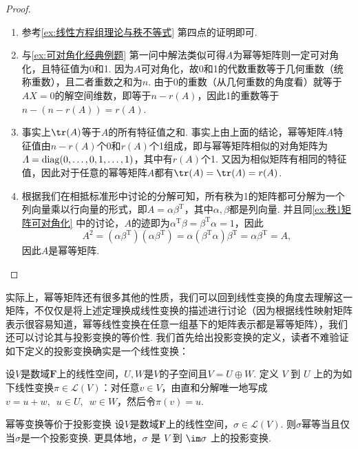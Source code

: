\begin{proof}
    \begin{enumerate}
        \item 参考\autoref{ex:线性方程组理论与秩不等式} 第四点的证明即可.

        \item 与\autoref{ex:可对角化经典例题} 第一问中解法类似可得$A$为幂等矩阵则一定可对角化，且特征值为0和1. 因为$A$可对角化，故0和1的代数重数等于几何重数（统称重数），且二者重数之和为$n$. 由于0的重数（从几何重数的角度看）就等于$AX=0$的解空间维数，即等于$n-r(A)$，因此1的重数等于$n-(n-r(A))=r(A)$.

        \item 事实上$\tr(A)$等于$A$的所有特征值之和. 事实上由上面的结论，幂等矩阵$A$特征值由$n-r(A)$个0和$r(A)$个1组成，即与幂等矩阵相似的对角矩阵为$\varLambda=\operatorname{diag}(0,\ldots,0,1,\ldots,1)$，其中有$r(A)$个1. 又因为相似矩阵有相同的特征值，因此对于任意的幂等矩阵$A$都有$\tr(A)=\tr(\varLambda)=r(A)$.

        \item 根据我们在相抵标准形中讨论的分解可知，所有秩为1的矩阵都可分解为一个列向量乘以行向量的形式，即$A=\alpha\beta^\mathrm{T}$，其中$\alpha,\beta$都是列向量. 并且同\autoref{ex:秩1矩阵可对角化} 中的讨论，$A$的迹即为$\alpha^\mathrm{T}\beta=\beta^\mathrm{T}\alpha=1$，因此
              \[A^2=(\alpha\beta^\mathrm{T})(\alpha\beta^\mathrm{T})=\alpha(\beta^\mathrm{T}\alpha)\beta^\mathrm{T}=\alpha\beta^\mathrm{T}=A,\]
              因此$A$是幂等矩阵.
    \end{enumerate}
\end{proof}

实际上，幂等矩阵还有很多其他的性质，我们可以回到线性变换的角度去理解这一矩阵，不仅仅是将上述定理换成线性变换的描述进行讨论（因为根据线性映射矩阵表示很容易知道，幂等线性变换在任意一组基下的矩阵表示都是幂等矩阵），我们还可以讨论其与投影变换的等价性. 我们首先给出投影变换的定义，读者不难验证如下定义的投影变换确实是一个线性变换：

\begin{definition}{}{}
    设$V$是数域$\mathbf{F}$上的线性空间，$U,W$是$V$的子空间且$V=U\oplus W$. 定义 $V$ 到 $U$ 上的为如下线性变换$\pi\in \mathcal{L}(V)$：对任意$v\in V$，由直和分解唯一地写成$v=u+w,\enspace u\in U,\enspace w\in W$，然后令$\pi(v)=u$.
\end{definition}

\begin{theorem}{}{幂等变换等价于投影变换}
    设$V$是数域$\mathbf{F}$上的线性空间，$\sigma\in \mathcal{L}(V)$. 则$\sigma$幂等当且仅当$\sigma$是一个投影变换. 更具体地，$\sigma$ 是 $V$ 到 $\im \sigma$ 上的投影变换.
\end{theorem}


